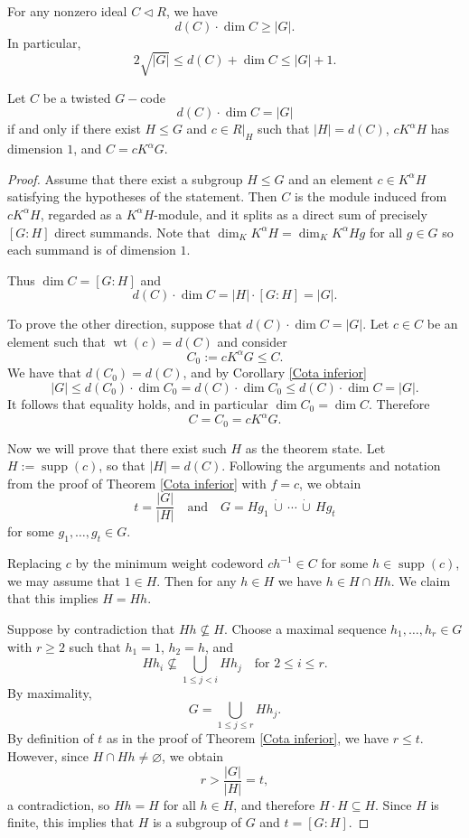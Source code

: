 \documentclass[10pt,a4paper]{amsart}
\DeclareMathOperator{\supp}{supp}
\DeclareMathOperator{\wt}{wt}
\begin{document}
\begin{corollary} \label{Cota inferior}
For any nonzero ideal $C\triangleleft R$, we have
\[
d(C)\cdot \dim C \ge |G|.
\]
In particular,
\[
2\sqrt{|G|} \le d(C) + \dim C \le |G| + 1.
\]
\end{corollary}

\begin{theorem}
Let $C$ be a twisted $G-$code
\[
d(C)\cdot \dim C = |G|
\]
if and only if there exist $H \le G$ and $c \in R|_H$ such that
$|H| = d(C)$, $c K^\alpha H$ has dimension $1$, and $C = c K^\alpha G$.
\end{theorem}

\begin{proof}
Assume that there exist a subgroup $H \leq G$ and an element $c \in K^{\alpha}H$ satisfying the hypotheses of the statement. Then $C$ is the module induced from $cK^{\alpha}H$, regarded as a $K^{\alpha}H$-module, and it splits as a direct sum of precisely $[G : H]$ direct summands. Note that $\dim_K K^\alpha H = \dim_K K^\alpha Hg$ for all $g\in G$ so each summand is of dimension $1$.

Thus $\dim C = [G:H]$ and
\[
d(C)\cdot \dim C = |H|\cdot [G:H] = |G|.
\]

To prove the other direction, suppose that $d(C)\cdot \dim C = |G|$.
Let $c \in C$ be an element such that $\wt(c) = d(C)$ and consider
\[
C_0 := c K^\alpha G \le C.
\]
We have that $d(C_0) = d(C)$, and by Corollary \ref{Cota inferior}
\[
|G| \le d(C_0)\cdot \dim C_0
= d(C)\cdot \dim C_0
\le d(C)\cdot \dim C
= |G|.
\]
It follows that equality holds, and in particular $\dim C_0 = \dim C$. Therefore
\[
C = C_0 = c K^{\alpha}G.
\]

Now we will prove that there exist such $H$ as the theorem state. 
Let $H := \supp(c)$, so that $|H| = d(C)$.
Following the arguments and notation from the proof of Theorem \ref{Cota inferior}
with $f = c$, we obtain
\[
t = \frac{|G|}{|H|}
\quad\text{and}\quad
G = H g_1 \,\dot{\cup}\, \cdots \,\dot{\cup}\, H g_t
\]
for some $g_1,\dots,g_t \in G$.

Replacing $c$ by the minimum weight codeword $c h^{-1} \in C$ for some
$h \in \supp(c)$, we may assume that $1 \in H$.
Then for any $h \in H$ we have $h \in H \cap H h$.
We claim that this implies $H = H h$.

Suppose by contradiction that $H h \nsubseteq H$.
Choose a maximal sequence $h_1,\dots,h_r \in G$ with $r \ge 2$ such that
$h_1 = 1$, $h_2 = h$, and
\[
H h_i \nsubseteq \bigcup_{1 \le j < i} H h_j
\quad\text{for } 2 \le i \le r.
\]
By maximality,
\[
G = \bigcup_{1 \le j \le r} H h_j.
\]
By definition of $t$ as in the proof of Theorem \ref{Cota inferior}, we have $r \leq t $.
However, since $H \cap H h \neq \varnothing$, we obtain
\[
r > \frac{|G|}{|H|} = t,
\]
a contradiction, so $H h = H$ for all $h \in H$, and therefore $H \cdot H \subseteq H$.
Since $H$ is finite, this implies that $H$ is a subgroup of $G$ and
$t = [G:H]$.


\end{proof}
\end{document}
